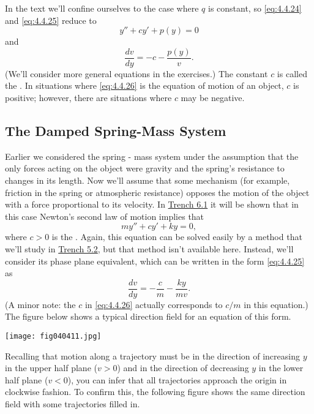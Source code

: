 \documentclass{ximera}
\begin{document}
In the text we'll confine ourselves to the case where $q$
is constant, so \eqref{eq:4.4.24} and \eqref{eq:4.4.25}  reduce to
\begin{equation} \label{eq:4.4.26}
y''+cy'+p(y)=0
\end{equation}
and
$$
\frac{dv}{dy}=-c-\frac{p(y)}{v}.
$$
(We'll consider more general equations in the exercises.) The constant
$c$ is called the . In situations where
\eqref{eq:4.4.26} is the equation of motion of an object, $c$ is positive;
however, there are situations where  $c$ may be negative.
 
\subsection*{The Damped Spring-Mass System}
 
Earlier we considered
the spring - mass system under the assumption that the only forces
acting on the object were gravity and the spring's resistance to
changes in its length. Now we'll assume that some mechanism (for
example, friction in the spring or atmospheric resistance) opposes the
motion of the object with a force proportional to its velocity. In \href{https://ximera.osu.edu/ode/main/springProblemsI/springProblemsI}{Trench 6.1} it will be shown that in this case Newton's
second law of motion implies that
\begin{equation} \label{eq:4.4.27}
my''+cy'+ky=0,
\end{equation}
where $c>0$ is the . Again, this
equation can
be solved easily by a method that we'll study in \href{https://ximera.osu.edu/ode/main/constantCoefficientHomogeneousEquations/constantCoefficientHomogeneousEquations}{Trench 5.2},
but that method isn't available here. Instead, we'll consider its
phase plane equivalent, which can be written in the form \eqref{eq:4.4.25}
as
\begin{equation} \label{eq:4.4.28}
\frac{dv}{dy}=-\frac{c}{m}-\frac{ky}{mv}.
\end{equation}
(A minor note: the $c$ in \eqref{eq:4.4.26} actually corresponds to
$c/m$ in this equation.) The figure below shows a
typical direction field for an equation of this form.
 
\begin{image}
 \texttt{[image: fig040411.jpg]}
\end{image}
 
 
Recalling that
motion along a trajectory must be in the direction of increasing $y$
in the upper half plane ($v>0$) and in the direction of decreasing $y$
in the lower half plane ($v<0$), you can infer that all trajectories
approach the origin in clockwise fashion. To confirm this, the following figure shows the same direction field with some
trajectories filled in.
 
\end{document}
